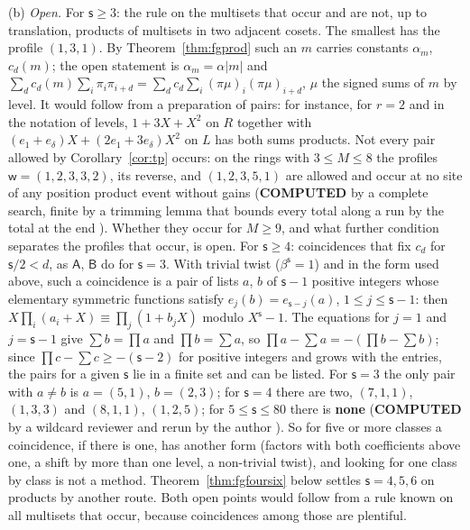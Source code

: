 \begin{remark}
(b) \emph{Open.} For $\mathsf{s}\ge3$: the rule on the multisets that occur and are not, up to translation, products of multisets in two adjacent cosets. The smallest has the profile $(1,3,1)$. By Theorem~\ref{thm:fgprod} such an $m$ carries constants $\alpha_m$, $c_d(m)$; the open statement is $\alpha_m=\alpha|m|$ and $\sum_dc_d(m)\sum_i\pi_i\pi_{i+d}=\sum_dc_d\sum_i(\pi\mu)_i(\pi\mu)_{i+d}$, $\mu$ the signed sums of $m$ by level. It would follow from a preparation of pairs: for instance, for $r=2$ and in the notation of levels, $1+3X+X^{2}$ on $R$ together with $(e_1+e_\delta)X+(2e_1+3e_\delta)X^{2}$ on $L$ has both sums products. Not every pair allowed by Corollary~\ref{cor:tp} occurs: on the rings with $3\le M\le8$ the profiles $\mathsf{w}=(1,2,3,3,2)$, its reverse, and $(1,2,3,5,1)$ are allowed and occur at no site of any position product event without gains (\textbf{COMPUTED} by a complete search, finite by a trimming lemma that bounds every total along a run by the total at the end \cite{comptp}). Whether they occur for $M\ge9$, and what further condition separates the profiles that occur, is open. For $\mathsf{s}\ge4$: coincidences that fix $c_d$ for $\mathsf{s}/2<d$, as $\mathsf{A}$, $\mathsf{B}$ do for $\mathsf{s}=3$. With trivial twist ($\beta^{\mathsf{s}}=1$) and in the form used above, such a coincidence is a pair of lists $a$, $b$ of $\mathsf{s}-1$ positive integers whose elementary symmetric functions satisfy $e_j(b)=e_{\mathsf{s}-j}(a)$, $1\le j\le\mathsf{s}-1$: then $X\prod_i(a_i+X)\equiv\prod_j(1+b_jX)$ modulo $X^{\mathsf{s}}-1$. The equations for $j=1$ and $j=\mathsf{s}-1$ give $\sum b=\prod a$ and $\prod b=\sum a$, so $\prod a-\sum a=-(\prod b-\sum b)$; since $\prod c-\sum c\ge-(\mathsf{s}-2)$ for positive integers and grows with the entries, the pairs for a given $\mathsf{s}$ lie in a finite set and can be listed. For $\mathsf{s}=3$ the only pair with $a\ne b$ is $a=(5,1)$, $b=(2,3)$; for $\mathsf{s}=4$ there are two, $(7,1,1)$, $(1,3,3)$ and $(8,1,1)$, $(1,2,5)$; for $5\le\mathsf{s}\le80$ there is \textbf{none} (\textbf{COMPUTED} by a wildcard reviewer and rerun by the author \cite{comptp}). So for five or more classes a coincidence, if there is one, has another form (factors with both coefficients above one, a shift by more than one level, a non-trivial twist), and looking for one class by class is not a method. Theorem~\ref{thm:fgfoursix} below settles $\mathsf{s}=4,5,6$ on products by another route. Both open points would follow from a rule known on all multisets that occur, because coincidences among those are plentiful.

\end{remark}
